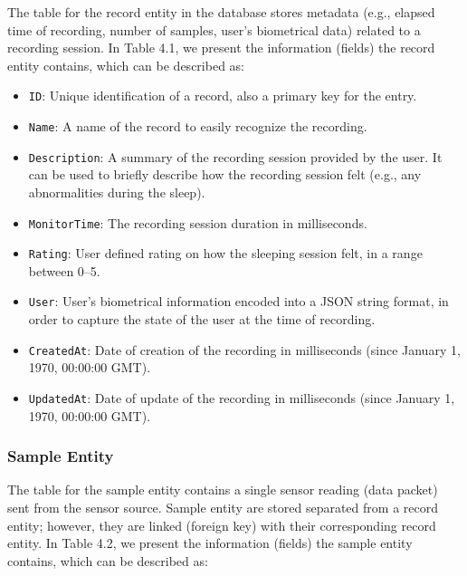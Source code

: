 The table for the record entity in the database stores metadata (e.g., elapsed time of recording, number of samples, user's biometrical data) related to a recording session. In Table 4.1, we present the information (fields) the record entity contains, which can be described as: 
\begin{itemize}
    \item \verb|ID|: Unique identification of a record, also a primary key for the entry.
    \item \verb|Name|: A name of the record to easily recognize the recording.
    \item \verb|Description|: A summary of the recording session provided by the user. It can be used to briefly describe how the recording session felt (e.g., any abnormalities during the sleep).
    \item \verb|MonitorTime|: The recording session duration in milliseconds.
    \item \verb|Rating|: User defined rating on how the sleeping session felt, in a range between 0--5. 
    \item \verb|User|: User's biometrical information encoded into a JSON string format, in order to capture the state of the user at the time of recording. 
    \item \verb|CreatedAt|: Date of creation of the recording in milliseconds (since January 1, 1970, 00:00:00 GMT).
    \item \verb|UpdatedAt|: Date of update of the recording in milliseconds (since January 1, 1970, 00:00:00 GMT).
\end{itemize}

\begin{table}[!h]
\begin{center}
\caption{Example entry in the record table.}
\end{center}
\end{table}





\subsubsection{Sample Entity} \label{ssec:sample}
The table for the sample entity contains a single sensor reading (data packet) sent from the sensor source. Sample entity are stored separated from a record entity; however, they are linked (foreign key) with their corresponding record entity. In Table 4.2, we present the information (fields) the sample entity contains, which can be described as: 

